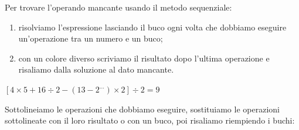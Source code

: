 \begin{procedura}{}{}
Per trovare l'operando mancante usando il metodo sequenziale:
\begin{enumerate} [noitemsep]
\item risolviamo l'espressione lasciando il buco ogni volta che 
dobbiamo eseguire un'operazione tra un numero e un buco;
\item con un colore diverso scriviamo il risultato dopo l'ultima operazione
e risaliamo dalla soluzione al dato mancante.
\end{enumerate}
\end{procedura}

  \begin{esempio}{}{}
\quad \(\left[ 4 \times 5 + 16 \div 2 -
  \left(13 - 2^{\dots} \right) \times 2 \right] \div 2 = 9\)

Sottolineiamo le operazioni che dobbiamo eseguire,
sostituiamo le operazioni sottolineate con il loro risultato o con un buco,
poi risaliamo riempiendo i buchi:


\end{esempio}

